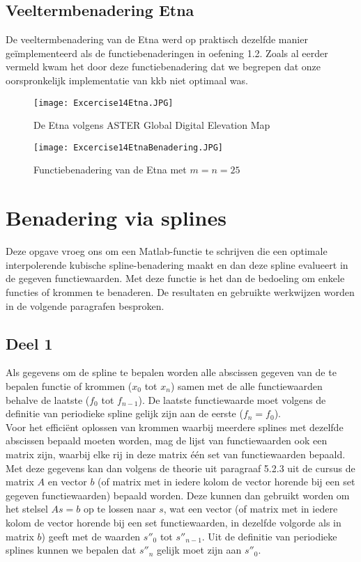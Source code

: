 \documentclass[a4paper]{article}
\begin{document}
\subsection{Veeltermbenadering Etna}
De veeltermbenadering van de Etna werd op praktisch dezelfde manier geïmplementeerd als de functiebenaderingen in oefening 1.2. Zoals al eerder vermeld kwam het door deze functiebenadering dat we begrepen dat onze oorspronkelijk implementatie van kkb niet optimaal was.
\begin{figure}
\caption{De Etna volgens  ASTER Global Digital Elevation Map}
\texttt{[image: Excercise14Etna.JPG]}
\end{figure}
\begin{figure}
\caption{Functiebenadering van de Etna met $m = n = 25$}
\texttt{[image: Excercise14EtnaBenadering.JPG]}
\end{figure}
\section{Benadering via splines}
Deze opgave vroeg ons om een Matlab-functie te schrijven die een optimale interpolerende kubische spline-benadering maakt en dan deze spline evalueert in de gegeven functiewaarden. Met deze functie is het dan de bedoeling om enkele functies of krommen te benaderen. De resultaten en gebruikte werkwijzen worden in de volgende paragrafen besproken.
\subsection{Deel 1}
Als gegevens om de spline te bepalen worden alle abscissen gegeven van de te bepalen functie of krommen ($x_{0}$ tot $x_{n}$) samen met de alle functiewaarden behalve de laatste ($f_{0}$ tot $f_{n-1}$). De laatste functiewaarde moet volgens de definitie van periodieke spline gelijk zijn aan de eerste ($f_{n} = f_{0}$).\\

Voor het efficiënt oplossen van krommen waarbij meerdere splines met dezelfde abscissen bepaald moeten worden, mag de lijst van functiewaarden ook een matrix zijn, waarbij elke rij in deze matrix één set van functiewaarden bepaald.\\

Met deze gegevens kan dan volgens de theorie uit paragraaf 5.2.3 uit de cursus de matrix $A$ en vector $b$ (of matrix met in iedere kolom de vector horende bij een set gegeven functiewaarden) bepaald worden. Deze kunnen dan gebruikt worden om het stelsel $As = b$ op te lossen naar $s$, wat een vector (of matrix met in iedere kolom de vector horende bij een set functiewaarden, in dezelfde volgorde als in matrix $b$) geeft met de waarden $s''_{0}$ tot $s''_{n-1}$. Uit de definitie van periodieke splines kunnen we bepalen dat $s''_{n}$ gelijk moet zijn aan $s''_{0}$.
\end{document}
